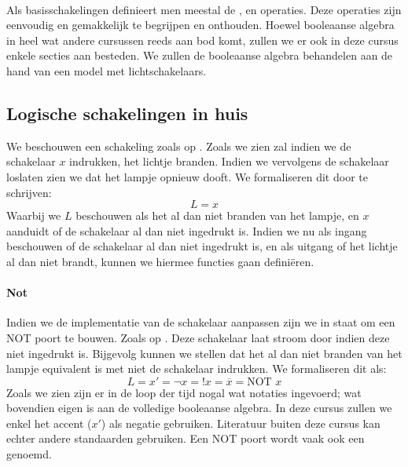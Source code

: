 \paragraph{}
Als basisschakelingen definieert men meestal de ,  en  operaties. Deze operaties zijn eenvoudig en gemakkelijk te begrijpen en onthouden. Hoewel booleaanse algebra in heel wat andere cursussen reeds aan bod komt, zullen we er ook in deze cursus enkele secties aan besteden. We zullen de booleaanse algebra behandelen aan de hand van een model met lichtschakelaars.
\subsection{Logische schakelingen in huis}
We beschouwen een schakeling zoals op .
Zoals we zien zal indien we de schakelaar $x$ indrukken, het lichtje branden. Indien we vervolgens de schakelaar loslaten zien we dat het lampje opnieuw dooft. We formaliseren dit door te schrijven:
\begin{equation}
L=x
\end{equation}
Waarbij we $L$ beschouwen als het al dan niet branden van het lampje, en $x$ aanduidt of de schakelaar al dan niet ingedrukt is. Indien we nu als ingang beschouwen of de schakelaar al dan niet ingedrukt is, en als uitgang of het lichtje al dan niet brandt, kunnen we hiermee functies gaan defini\"eren.
\paragraph{Not}
Indien we de implementatie van de schakelaar aanpassen zijn we in staat om een NOT poort te bouwen. Zoals op . Deze schakelaar laat stroom door indien deze niet ingedrukt is. Bijgevolg kunnen we stellen dat het al dan niet branden van het lampje equivalent is met niet de schakelaar indrukken. We formaliseren dit als:
\begin{equation}
L=x'=\neg x=!x=\overline{x}=\mbox{NOT }x
\end{equation}
Zoals we zien zijn er in de loop der tijd nogal wat notaties ingevoerd; wat bovendien eigen is aan de volledige booleaanse algebra. In deze cursus zullen we enkel het accent ($x'$) als negatie gebruiken. Literatuur buiten deze cursus kan echter andere standaarden gebruiken. Een NOT poort wordt vaak ook een  genoemd.
